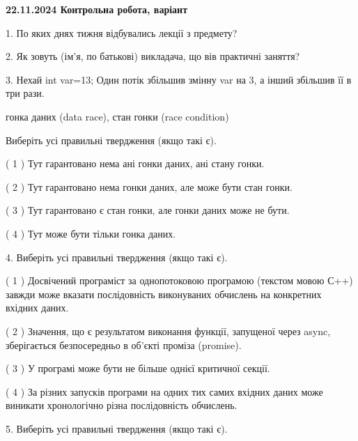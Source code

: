 \documentclass[12pt, ukrainian]{article}
\begin{document}
\vspace{4mm}
\newpage
\begin {large}

\textbf{22.11.2024 Контрольна робота, варіант  }\par


{
1. По яких днях тижня відбувались лекції з предмету?



\vspace{5mm}
2. Як зовуть (ім'я, по батькові) викладача, що вів практичні заняття?



\vspace{5mm}
3. Нехай int var=13; Один потік збільшив змінну var на 3, а інший збільшив її в три рази.

гонка даних (data race), стан гонки (race condition)

Виберіть усі правильні твердження (якщо такі є).\par
\vspace{2mm}
( 1 ) Тут гарантовано нема ані гонки даних, ані стану гонки.%

( 2 ) Тут гарантовано нема гонки даних, але може бути стан гонки.%

( 3 ) Тут гарантовано є стан гонки, але гонки даних може не бути.%

( 4 ) Тут може бути тільки гонка даних.%


\vspace{5mm}
4. Виберіть усі правильні твердження (якщо такі є).\par
\vspace{2mm}

( 1 ) Досвічений програміст за однопотоковою програмою (текстом мовою С++) завжди може вказати послідовність виконуваних обчислень на конкретних вхідних даних.%

( 2 ) Значення, що є результатом виконання функції, запущеної через async, зберігається безпосередньо в об’єкті проміза (promise).%

( 3 ) У програмі може бути не більше однієї критичної секції.%

( 4 ) За різних запусків програми на одних тих самих вхідних даних може виникати хронологічно різна послідовність обчислень.%


\vspace{5mm}
5. Виберіть усі правильні твердження (якщо такі є).\par
\vspace{2mm}

}
\end{large}
\end{document}
